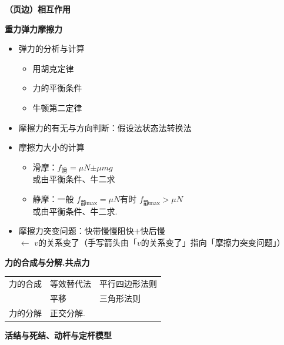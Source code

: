 \textbf{（页边）相互作用}

\textbf{重力\quad 弹力\quad 摩擦力}
\begin{itemize}
\item 弹力的分析与计算
  \begin{itemize}
  \item 用胡克定律
  \item 力的平衡条件
  \item 牛顿第二定律
  \end{itemize}
\item 摩擦力的有无与方向判断：假设法\quad 状态法\quad 转换法
\item 摩擦力大小的计算
  \begin{itemize}
  \item 滑摩：$f_{\text{滑}}=\mu N$\quad $\pm$\quad $\mu mg$ %
    \\ 或由平衡条件、牛二求
  \item 静摩：一般 $f_{\text{静max}}=\mu N$\quad 有时 $f_{\text{静max}}>\mu N$
    \\ 或由平衡条件、牛二求.
  \end{itemize}
\item 摩擦力突变问题：快带慢\quad 慢阻快\quad $+$\quad 快后慢
  \\ $\leftarrow$ $v$的关系变了\quad （手写箭头由「$v$的关系变了」指向「摩擦力突变问题」）
\end{itemize}
\textbf{力的合成与分解.}\quad \textbf{共点力}

\begin{tabular}{@{}lll@{}}
力的合成 & 等效替代法 & 平行四边形法则 \\
 & 平移 & 三角形法则 \\
力的分解 & 正交分解. & \\
\end{tabular}
\textbf{活结与死结、动杆与定杆模型}

